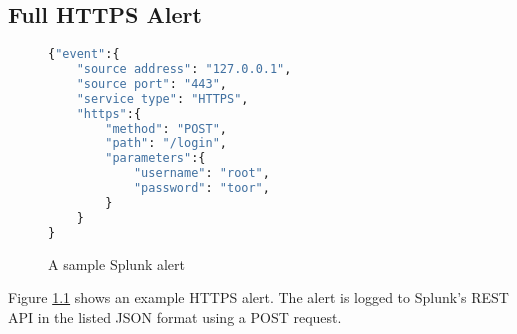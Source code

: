 \begin{appendices}

\chapter{Full HTTPS Alert}
\label{appendix:https-alert}

\begin{figure}[h]
\begin{lstlisting}[language=Python,frame=single,showstringspaces=false]
{"event":{
    "source address": "127.0.0.1",
    "source port": "443",
    "service type": "HTTPS",
    "https":{
        "method": "POST",
        "path": "/login",
        "parameters":{
            "username": "root",
            "password": "toor",
        }
    }
}
\end{lstlisting}
\caption{A sample Splunk alert}
\label{figure:sample-alert}
\end{figure}

Figure \ref{figure:sample-alert} shows an example HTTPS alert. The alert is
logged to Splunk's REST API in the listed JSON format using a POST request.

\end{appendices}
